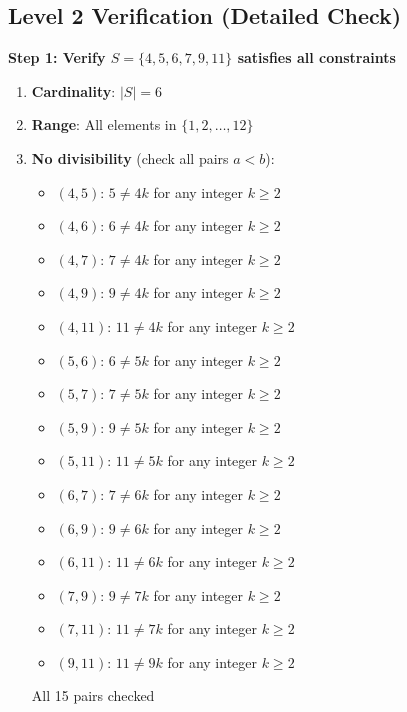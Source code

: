 \documentclass[12pt]{article}
\begin{document}
\begin{verificationbox}
\subsection*{Level 2 Verification (Detailed Check)}

\textbf{Step 1: Verify $S = \{4, 5, 6, 7, 9, 11\}$ satisfies all constraints}

\begin{enumerate}
    \item \textbf{Cardinality}: $|S| = 6$ \checkmark
    
    \item \textbf{Range}: All elements in $\{1,2,\ldots,12\}$ \checkmark
    
    \item \textbf{No divisibility} (check all pairs $a < b$):
    \begin{itemize}
        \item $(4,5)$: $5 \neq 4k$ for any integer $k \geq 2$ \checkmark
        \item $(4,6)$: $6 \neq 4k$ for any integer $k \geq 2$ \checkmark
        \item $(4,7)$: $7 \neq 4k$ for any integer $k \geq 2$ \checkmark
        \item $(4,9)$: $9 \neq 4k$ for any integer $k \geq 2$ \checkmark
        \item $(4,11)$: $11 \neq 4k$ for any integer $k \geq 2$ \checkmark
        \item $(5,6)$: $6 \neq 5k$ for any integer $k \geq 2$ \checkmark
        \item $(5,7)$: $7 \neq 5k$ for any integer $k \geq 2$ \checkmark
        \item $(5,9)$: $9 \neq 5k$ for any integer $k \geq 2$ \checkmark
        \item $(5,11)$: $11 \neq 5k$ for any integer $k \geq 2$ \checkmark
        \item $(6,7)$: $7 \neq 6k$ for any integer $k \geq 2$ \checkmark
        \item $(6,9)$: $9 \neq 6k$ for any integer $k \geq 2$ \checkmark
        \item $(6,11)$: $11 \neq 6k$ for any integer $k \geq 2$ \checkmark
        \item $(7,9)$: $9 \neq 7k$ for any integer $k \geq 2$ \checkmark
        \item $(7,11)$: $11 \neq 7k$ for any integer $k \geq 2$ \checkmark
        \item $(9,11)$: $11 \neq 9k$ for any integer $k \geq 2$ \checkmark
    \end{itemize}
    All 15 pairs checked \checkmark
\end{enumerate}


\end{verificationbox}
\end{document}
